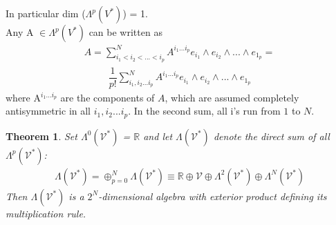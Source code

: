 \documentclass[12pt,a4paper]{article}
\newtheorem{thm}{Theorem}
\begin{document}
In particular dim ($\Lambda^{p}(V^*)$) = 1.\\
\indent Any A $\in \Lambda^{p}(V^*)$ can be written as 
\begin{align*}
A = \sum^{N}_{i_1 < i_2 < ... < i_p} A^{i_1...i_p}  e_{i_1} \wedge e_{i_2} \wedge ... \wedge e_{1_p} =
\end{align*}
\begin{align*}
 \dfrac{1}{p!} \sum^{N}_{i_1,i_2 ... i_p} A^{i_1...i_p}  e_{i_1} \wedge e_{i_2} \wedge ... \wedge e_{1_p}
\end{align*}
where A$^{i_1...i_p}$ are the components of $A$, which are assumed completely antisymmetric in all $i_1,i_2 ... i_p$. In the second sum, all i’s run from $1$ to $N$.\\
\begin{thm}
Set $\Lambda^{0}(\mathcal{V}^*)$ = $\mathbb{R}$ and let $\Lambda(\mathcal{V}^*)$ denote the direct
sum of all  $\Lambda^{p}(\mathcal{V}^*)$:
\begin{align*}
\Lambda(\mathcal{V}^*)  = \oplus^{N}_{p = 0}  \Lambda(\mathcal{V}^*) \equiv \mathbb{R} \oplus \mathcal{V} \oplus \Lambda^{2}(\mathcal{V}^*) \oplus \Lambda^{N}(\mathcal{V}^*)
\end{align*}
Then $\Lambda(\mathcal{V}^*)$ is a $2^N$-dimensional algebra with exterior product defining its multiplication rule.	
\end{thm}
\end{document}
